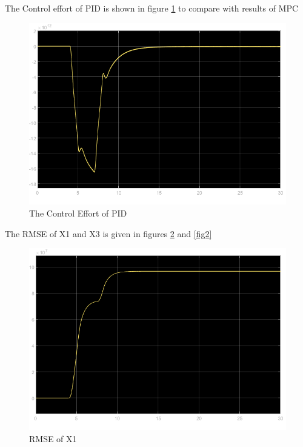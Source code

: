 \documentclass{article}
\begin{document}
The Control effort of PID is shown in figure \ref{fig:enter-lab2} to compare with results of MPC

\begin{figure}
    \centering
    \includegraphics[width=\linewidth]{images/PID_Control_Effort.png}
    \caption{The Control Effort of PID}
    \label{fig:enter-lab2}
\end{figure}

The RMSE of X1 and X3 is given in figures \ref{fig1} and \ref{fig2} 

\begin{figure}
    \centering
    \includegraphics[width=\linewidth]{images/PID_RMSE_X1.png}
    \caption{RMSE of X1}
    \label{fig1}
\end{figure}
\end{document}
